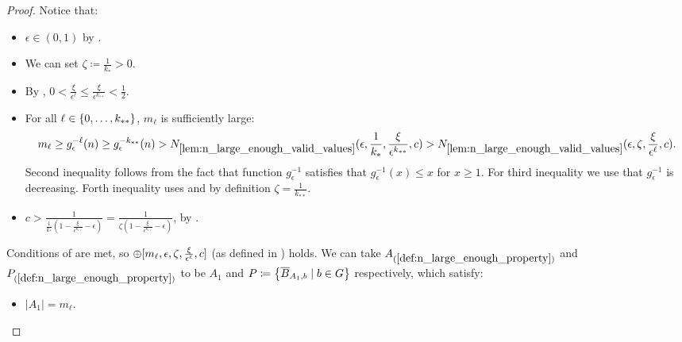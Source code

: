 \begin{lemma}
\begin{proof}
                Notice that:
                \begin{itemize}
                    \item $\epsilon \in (0,1)$ by .
                    \item We can set $\zeta \coloneqq \frac{1}{k_*} > 0$.
                    \item By ,
                        $0 < \frac{\xi}{\epsilon^\ell} \leq \frac{\xi}{\epsilon^{k_{**}}} < \frac{1}{2}$.
                    \item For all $\ell \in \{ 0,\dots,k_{**} \}$, $m_\ell$ is sufficiently large:
                        \[
                            m_\ell \geq g_\epsilon^{-\ell}(n) \geq g_\epsilon^{-k_{**}}(n)
                                > N_{\ref{lem:n_large_enough_valid_values}}( \epsilon, \frac{1}{k_*}, \frac{\xi}{\epsilon^{k_{**}}}, c )
                                > N_{\ref{lem:n_large_enough_valid_values}}( \epsilon, \zeta, \frac{\xi}{\epsilon^{\ell}}, c ).
                        \]
                        Second inequality follows from the fact that function $g_\epsilon^{-1}$ satisfies that
                        $g_\epsilon^{-1}(x) \leq x$ for $x \geq 1$.
                        For third inequality we use that $g_\epsilon^{-1}$ is decreasing.
                        Forth inequality uses  and by definition $\zeta = \frac{1}{k_{**}}$.
                    \item $c > \frac{1}{\frac{1}{k_*} (1 - \frac{\xi}{\epsilon^{k_{**}}} - \epsilon)}
                        = \frac{1}{\zeta (1 - \frac{\xi}{\epsilon^{k_{**}}} - \epsilon)}$, by .
                \end{itemize}
                Conditions of  are met, so
                $\oplus[ m_\ell, \epsilon, \zeta, \frac{\xi}{\epsilon^\ell}, c ]$
                (as defined in ) holds.
                We can take $A_{(\ref{def:n_large_enough_property})}$ and $P_{(\ref{def:n_large_enough_property})}$ to be
                $A_1$ and $P \coloneqq \bigl\{ \overline{B}_{A_1,b} \mid b \in G \bigr\}$ respectively, which satisfy:
                \begin{itemize}
                    \item $|A_1| = m_\ell$.

\end{itemize}
\end{proof}
\end{lemma}
